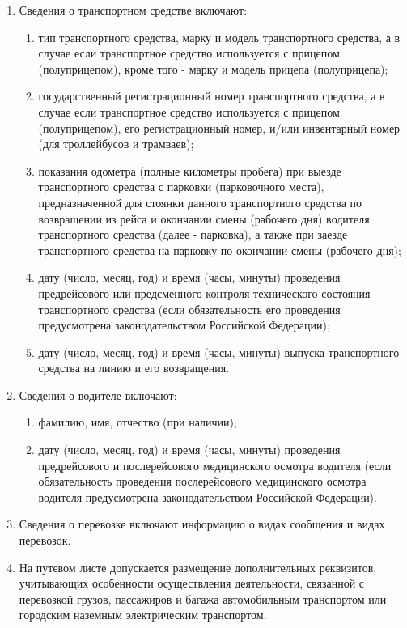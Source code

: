 \documentclass[../nirs.tex]{subfiles}
\begin{document}
\begin{enumerate}
	\item Сведения о транспортном средстве включают:

	\begin{enumerate}
		\item тип транспортного средства, марку и модель транспортного средства,
			а в случае если транспортное средство используется с прицепом
			(полуприцепом), кроме того - марку и модель прицепа (полуприцепа);
		\item государственный регистрационный номер транспортного средства, а в
			случае если транспортное средство используется с прицепом
			(полуприцепом), его регистрационный номер, и/или инвентарный номер
			(для троллейбусов и трамваев);
		\item показания одометра (полные километры пробега) при выезде
			транспортного средства с парковки (парковочного места),
			предназначенной для стоянки данного транспортного средства по
			возвращении из рейса и окончании смены (рабочего дня) водителя
			транспортного средства (далее - парковка), а также при заезде
			транспортного средства на парковку по окончании смены (рабочего
			дня);
		\item дату (число, месяц, год) и время (часы, минуты) проведения
			предрейсового или предсменного контроля технического состояния
			транспортного средства (если обязательность его проведения
			предусмотрена законодательством Российской Федерации);
		\item дату (число, месяц, год) и время (часы, минуты) выпуска
			транспортного средства на линию и его возвращения.
	\end{enumerate}

	\item Сведения о водителе включают:

	\begin{enumerate}
		\item фамилию, имя, отчество (при наличии);
		\item дату (число, месяц, год) и время (часы, минуты) проведения
			предрейсового и послерейсового медицинского осмотра водителя (если
			обязательность проведения послерейсового медицинского осмотра
			водителя предусмотрена законодательством Российской Федерации).
	\end{enumerate}

	\item Сведения о перевозке включают информацию о видах сообщения и видах
		перевозок.
	\item На путевом листе допускается размещение дополнительных реквизитов,
		учитывающих особенности осуществления деятельности, связанной с
		перевозкой грузов, пассажиров и багажа автомобильным транспортом или
		городским наземным электрическим транспортом.
\end{enumerate}
\end{document}
